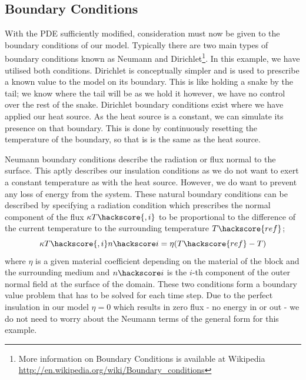 \subsection{Boundary Conditions}
With the PDE sufficiently modified, consideration must now be given to the boundary conditions of our model. Typically there are two main types of boundary conditions known as Neumann and Dirichlet\footnote{More information on Boundary Conditions is available at Wikipedia \url{http://en.wikipedia.org/wiki/Boundary_conditions}}. In this example, we have utilised both conditions. Dirichlet is conceptually simpler and is used to prescribe a known value to the model on its boundary. This is like holding a snake by the tail; we know where the tail will be as we hold it however, we have no control over the rest of the snake. Dirichlet boundary conditions exist where we have applied our heat source. As the heat source is a constant, we can simulate its presence on that boundary. This is done by continuously resetting the temperature of the boundary, so that is is the same as the heat source.  

Neumann boundary conditions describe the radiation or flux normal to the surface. This aptly describes our insulation conditions as we do not want to exert a constant temperature as with the heat source. However, we do want to prevent any loss of energy from the system. These natural boundary conditions can be described by specifying a radiation condition which prescribes the normal component of the flux $\kappa T\hackscore{,i}$ to be proportional
to the difference of the current temperature to the surrounding temperature $T\hackscore{ref}$;
\begin{equation}
 \kappa T\hackscore{,i} n\hackscore i = \eta (T\hackscore{ref}-T) 
\label{eqn:hdbc}
\end{equation}
where $\eta$ is a given material coefficient depending on the material of the block and the surrounding medium and $n\hackscore i$ is the $i$-th component of the outer normal field  at the surface of the domain. These two conditions form a boundary value problem that has to be solved for each time step. Due to the perfect insulation in our model $\eta = 0$ which results in zero flux - no energy in or out - we do not need to worry about the Neumann terms of the general form for this example.


